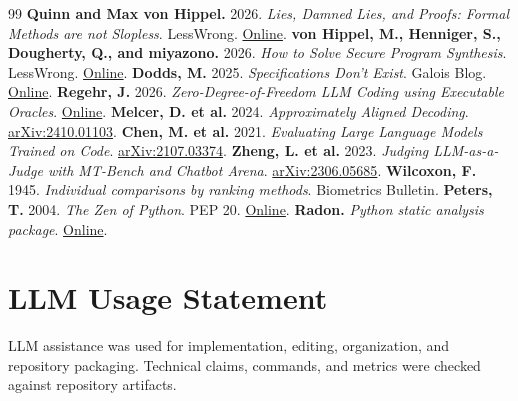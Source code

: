 \documentclass[11pt]{article}
\begin{document}
\begin{thebibliography}{99}
     \textbf{Quinn and Max von Hippel.} 2026. \textit{Lies, Damned Lies, and Proofs: Formal Methods are not Slopless}. LessWrong. \href{https://www.lesswrong.com/posts/rhAPh3YzhPoBNpgHg/lies-damned-lies-and-proofs-formal-methods-are-not-slopless}{Online}.
     \textbf{von Hippel, M., Henniger, S., Dougherty, Q., and miyazono.} 2026. \textit{How to Solve Secure Program Synthesis}. LessWrong. \href{https://www.lesswrong.com/posts/8wtrLoDPyCfMLuHkt/how-to-solve-secure-program-synthesis}{Online}.
     \textbf{Dodds, M.} 2025. \textit{Specifications Don't Exist}. Galois Blog. \href{https://www.galois.com/articles/specifications-dont-exist}{Online}.
     \textbf{Regehr, J.} 2026. \textit{Zero-Degree-of-Freedom LLM Coding using Executable Oracles}. \href{https://john.regehr.org/writing/zero_dof_programming.html}{Online}.
     \textbf{Melcer, D. et al.} 2024. \textit{Approximately Aligned Decoding}. \href{https://arxiv.org/abs/2410.01103}{arXiv:2410.01103}.
     \textbf{Chen, M. et al.} 2021. \textit{Evaluating Large Language Models Trained on Code}. \href{https://arxiv.org/abs/2107.03374}{arXiv:2107.03374}.
     \textbf{Zheng, L. et al.} 2023. \textit{Judging LLM-as-a-Judge with MT-Bench and Chatbot Arena}. \href{https://arxiv.org/abs/2306.05685}{arXiv:2306.05685}.
     \textbf{Wilcoxon, F.} 1945. \textit{Individual comparisons by ranking methods}. Biometrics Bulletin.
     \textbf{Peters, T.} 2004. \textit{The Zen of Python}. PEP 20. \href{https://peps.python.org/pep-0020/}{Online}.
     \textbf{Radon.} \textit{Python static analysis package}. \href{https://radon.readthedocs.io/}{Online}.
\end{thebibliography}

\section*{LLM Usage Statement}

LLM assistance was used for implementation, editing, organization, and
repository packaging. Technical claims, commands, and metrics were checked
against repository artifacts.
\end{document}
